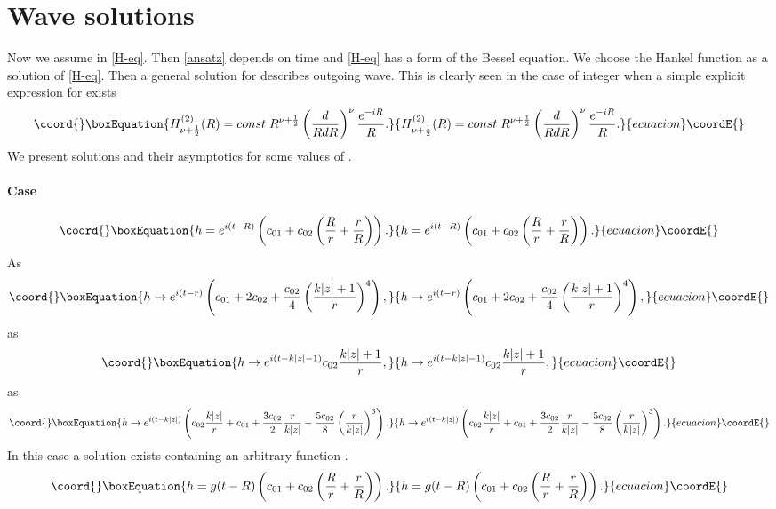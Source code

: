 \documentclass[letterpaper,12pt]{article}
\begin{document}
\section{Wave solutions}\label{wave}
Now we assume \coordHE{} in  \eqref{H-eq}. Then \eqref{ansatz}
depends on time and  \eqref{H-eq} has a form of the Bessel
equation. We choose the Hankel function
\coordHE{} as a solution of \eqref{H-eq}.
Then a general solution for \coordHE{} describes outgoing wave. This is
clearly seen in the case  of integer \myHighlight{$\nu$}\coordHE{} when a simple explicit
expression for \coordHE{} exists
\begin{equation}\coord{}\boxEquation{
\label{Hankel}
 H_{\nu+\frac{1}{2}}^{(2)}(R) = const\;
 R^{\nu+\frac{1}{2}}\left(\frac{d}{RdR}\right)^{\nu}\frac{e^{-iR}}{R}.
}{
H_{\nu+\frac{1}{2}}^{(2)}(R) = const\;
 R^{\nu+\frac{1}{2}}\left(\frac{d}{RdR}\right)^{\nu}\frac{e^{-iR}}{R}.
}{ecuacion}\coordE{}\end{equation}
We present solutions and their asymptotics for some values of
\myHighlight{$\nu$}\coordHE{}.
\paragraph{Case \coordHE{}}
\begin{equation}\coord{}\boxEquation{
\label{h(t,0)}
 h=e^{i(t-R)}\left(c_{01}+c_{02}\left(\frac{R}{r}+\frac{r}{R}\right)\right).
}{
h=e^{i(t-R)}\left(c_{01}+c_{02}\left(\frac{R}{r}+\frac{r}{R}\right)\right).
}{ecuacion}\coordE{}\end{equation}
As \coordHE{}
\begin{equation}\coord{}\boxEquation{
\label{}
 h\to e^{i(t-r)}\left(c_{01}+
 2c_{02}+\frac{c_{02}}{4}\left(\frac{k|z|+1}{r}\right)^4\right),
}{
h\to e^{i(t-r)}\left(c_{01}+
 2c_{02}+\frac{c_{02}}{4}\left(\frac{k|z|+1}{r}\right)^4\right),
}{ecuacion}\coordE{}\end{equation}
as \coordHE{}
\begin{equation}\coord{}\boxEquation{
\label{}
 h\to e^{i(t-k|z|-1)}c_{02}\frac{k|z|+1}{r},
}{
h\to e^{i(t-k|z|-1)}c_{02}\frac{k|z|+1}{r},
}{ecuacion}\coordE{}\end{equation}
as \coordHE{}
\begin{equation}\coord{}\boxEquation{
\label{}
 h\to e^{i(t-k|z|)}\left(c_{02}\frac{k|z|}{r} + c_{01} +
 \frac{3c_{02}}{2}\frac{r}{k|z|}-
 \frac{5c_{02}}{8}\left(\frac{r}{k|z|}\right)^3\right).
}{
h\to e^{i(t-k|z|)}\left(c_{02}\frac{k|z|}{r} + c_{01} +
 \frac{3c_{02}}{2}\frac{r}{k|z|}-
 \frac{5c_{02}}{8}\left(\frac{r}{k|z|}\right)^3\right).
}{ecuacion}\coordE{}\end{equation}
In this case a solution exists containing an arbitrary function
\coordHE{}.
\begin{equation}\coord{}\boxEquation{
\label{}
 h=g(t-R)\left(c_{01}+c_{02}\left(\frac{R}{r}+\frac{r}{R}\right)\right).
}{
h=g(t-R)\left(c_{01}+c_{02}\left(\frac{R}{r}+\frac{r}{R}\right)\right).
}{ecuacion}\coordE{}\end{equation}
\end{document}
